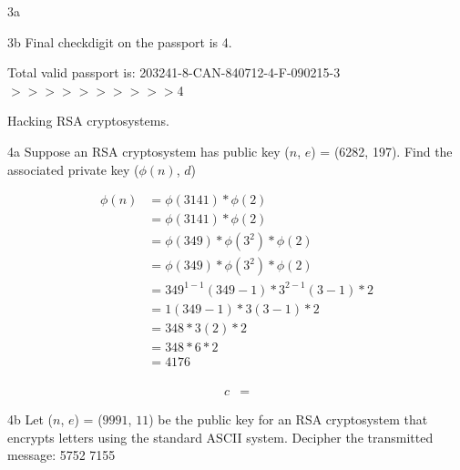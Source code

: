 \begin{question}{3a}
\begin{question}{3b}
Final checkdigit on the passport is 4.

Total valid passport is: 203241-8-CAN-840712-4-F-090215-3$>>>>>>>>>>$4


\end{question}


\begin{question}{4}
Hacking RSA cryptosystems.
\end{question}


\begin{question}{4a}
Suppose an RSA cryptosystem has public key ($n$, $e$) = (6282, 197). Find the associated private key ($\phi(n)$, $d$)
\end{question}

\begin{align*}
\phi(n) &= \phi(3141) * \phi(2) \\
        &= \phi(3141) * \phi(2) \\
        &= \phi(349) * \phi(3^2) * \phi(2) \\
        &= \phi(349) * \phi(3^2) * \phi(2) \\
        &= 349^{1-1}(349-1) * 3^{2-1}(3-1) * 2 \\
        &= 1(349-1) * 3(3-1) * 2 \\
        &= 348 * 3(2) * 2 \\
        &= 348 * 6 * 2 \\
        &= 4176 \\
\end{align*}

\begin{align*}
c &= 
\end{align*}


\begin{question}{4b}
Let ($n$, $e$) = ($9991$, $11$) be the public key for an RSA cryptosystem that encrypts
letters using the standard ASCII system. Decipher the transmitted message: 5752 7155
\end{question}


\end{question}
